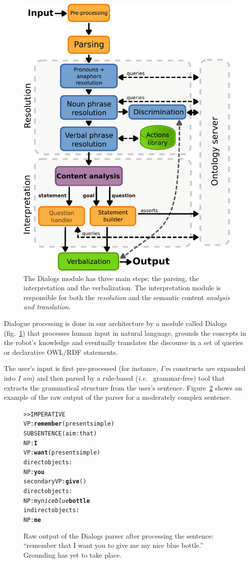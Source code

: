 \documentclass{svmult}
\newcommand{\ie}{{\textit{i.e.~}}}
\begin{document}
\begin{figure}[!t]
\centering
  \includegraphics[width=0.5\linewidth]{figs/dialog_module_simple.pdf}
  \caption{The {\sc Dialogs} module has three main steps: the parsing,
  the interpretation and the verbalization. The interpretation module is
  responsible for both the \emph{resolution} and the semantic content
  \emph{analysis and translation}.} 
  \label{fig|dialog}
\end{figure}

Dialogue processing is done in our architecture by a module called {\sc
Dialogs}\cite{Lemaignan2011b} (fig.~\ref{fig|dialog}) that processes human
input in natural language, grounds the concepts in the robot's knowledge and
eventually translates the discourse in a set of queries or declarative OWL/RDF
statements.  

The user's input is first pre-processed (for instance, \emph{I'm} constructs
are expanded into \emph{I am}) and then parsed by a rule-based (\ie
grammar-free) tool that extracts the grammatical structure from the user's
sentence. Figure~\ref{dialog|parser_output} shows an example of the raw output
of the parser for a moderately complex sentence.

\begin{figure}%
\begin{center}
\scriptsize
\begin{alltt}
>> IMPERATIVE
VP: \textbf{remember} (present simple)
    SUBSENTENCE (aim: that)
      NP: \textbf{I}
      VP: \textbf{want} (present simple)
        direct objects: 
          NP: \textbf{you}
        secondary VP: \textbf{give} ()
              direct objects:
                NP: my \emph{nice blue} \textbf{bottle}
              indirect objects:
                NP: \textbf{me}
\end{alltt}
\end{center}
\caption{Raw output of the {\sc Dialogs} parser after processing the
sentence: ``remember that I want you to give me my nice blue bottle.'' 
Grounding has yet to take place.} 
\label{dialog|parser_output}
\end{figure}
\end{document}
